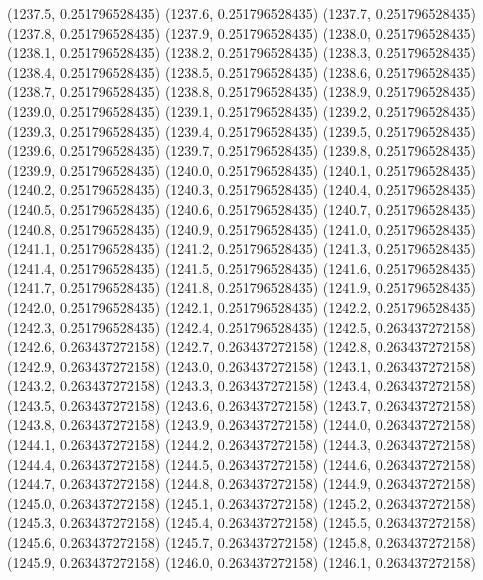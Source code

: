 {					(1237.5, 0.251796528435)
					(1237.6, 0.251796528435)
					(1237.7, 0.251796528435)
					(1237.8, 0.251796528435)
					(1237.9, 0.251796528435)
					(1238.0, 0.251796528435)
					(1238.1, 0.251796528435)
					(1238.2, 0.251796528435)
					(1238.3, 0.251796528435)
					(1238.4, 0.251796528435)
					(1238.5, 0.251796528435)
					(1238.6, 0.251796528435)
					(1238.7, 0.251796528435)
					(1238.8, 0.251796528435)
					(1238.9, 0.251796528435)
					(1239.0, 0.251796528435)
					(1239.1, 0.251796528435)
					(1239.2, 0.251796528435)
					(1239.3, 0.251796528435)
					(1239.4, 0.251796528435)
					(1239.5, 0.251796528435)
					(1239.6, 0.251796528435)
					(1239.7, 0.251796528435)
					(1239.8, 0.251796528435)
					(1239.9, 0.251796528435)
					(1240.0, 0.251796528435)
					(1240.1, 0.251796528435)
					(1240.2, 0.251796528435)
					(1240.3, 0.251796528435)
					(1240.4, 0.251796528435)
					(1240.5, 0.251796528435)
					(1240.6, 0.251796528435)
					(1240.7, 0.251796528435)
					(1240.8, 0.251796528435)
					(1240.9, 0.251796528435)
					(1241.0, 0.251796528435)
					(1241.1, 0.251796528435)
					(1241.2, 0.251796528435)
					(1241.3, 0.251796528435)
					(1241.4, 0.251796528435)
					(1241.5, 0.251796528435)
					(1241.6, 0.251796528435)
					(1241.7, 0.251796528435)
					(1241.8, 0.251796528435)
					(1241.9, 0.251796528435)
					(1242.0, 0.251796528435)
					(1242.1, 0.251796528435)
					(1242.2, 0.251796528435)
					(1242.3, 0.251796528435)
					(1242.4, 0.251796528435)
					(1242.5, 0.263437272158)
					(1242.6, 0.263437272158)
					(1242.7, 0.263437272158)
					(1242.8, 0.263437272158)
					(1242.9, 0.263437272158)
					(1243.0, 0.263437272158)
					(1243.1, 0.263437272158)
					(1243.2, 0.263437272158)
					(1243.3, 0.263437272158)
					(1243.4, 0.263437272158)
					(1243.5, 0.263437272158)
					(1243.6, 0.263437272158)
					(1243.7, 0.263437272158)
					(1243.8, 0.263437272158)
					(1243.9, 0.263437272158)
					(1244.0, 0.263437272158)
					(1244.1, 0.263437272158)
					(1244.2, 0.263437272158)
					(1244.3, 0.263437272158)
					(1244.4, 0.263437272158)
					(1244.5, 0.263437272158)
					(1244.6, 0.263437272158)
					(1244.7, 0.263437272158)
					(1244.8, 0.263437272158)
					(1244.9, 0.263437272158)
					(1245.0, 0.263437272158)
					(1245.1, 0.263437272158)
					(1245.2, 0.263437272158)
					(1245.3, 0.263437272158)
					(1245.4, 0.263437272158)
					(1245.5, 0.263437272158)
					(1245.6, 0.263437272158)
					(1245.7, 0.263437272158)
					(1245.8, 0.263437272158)
					(1245.9, 0.263437272158)
					(1246.0, 0.263437272158)
					(1246.1, 0.263437272158)
}
